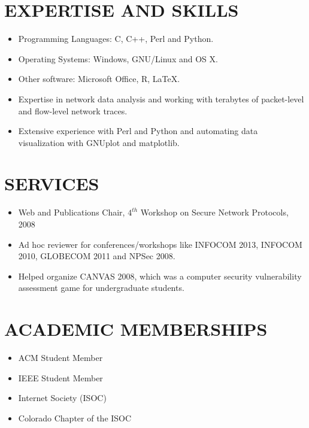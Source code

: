 \documentclass[line,margin]{res}
\begin{document}
\begin{resume}
\section{EXPERTISE AND SKILLS}
	\begin{itemize}
		\item Programming Languages: C, C++, Perl and Python.
		\item Operating Systems: Windows, GNU/Linux and OS X.
		\item Other software: Microsoft Office, R, LaTeX.
		\item Expertise in network data analysis and working with terabytes of packet-level and flow-level network traces.
		\item Extensive experience with Perl and Python and automating data
			visualization with GNUplot and matplotlib.
	\end{itemize}

\section{SERVICES}
	\begin{itemize}
                \item Web and Publications Chair, $4^{th}$ Workshop on Secure Network Protocols, 2008
                \item Ad hoc reviewer for conferences/workshops like INFOCOM 2013, INFOCOM 2010, GLOBECOM 2011 and NPSec 2008.
                \item Helped organize CANVAS 2008, which was a computer security vulnerability assessment game for undergraduate students.
         \end{itemize}



\section{ACADEMIC MEMBERSHIPS}
	\begin{itemize}
		\item ACM Student Member
		\item IEEE Student Member
		\item Internet Society (ISOC)
		\item Colorado Chapter of the ISOC
	\end{itemize}


\end{resume}
\end{document}
